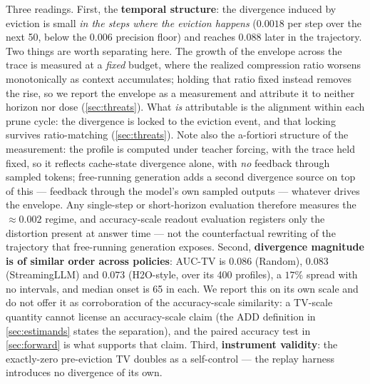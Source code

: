 \documentclass{article}
\begin{document}
Three readings. First, the \textbf{temporal structure}: the divergence induced by eviction is small \emph{in the steps where the eviction happens} ($0.0018$ per step over the next 50, below the $0.006$ precision floor) and reaches $0.088$ later in the trajectory. Two things are worth separating here. The growth of the envelope across the trace is measured at a \emph{fixed} budget, where the realized compression ratio worsens monotonically as context accumulates; holding that ratio fixed instead removes the rise, so we report the envelope as a measurement and attribute it to neither horizon nor dose (\cref{sec:threats}). What \emph{is} attributable is the alignment within each prune cycle: the divergence is locked to the eviction event, and that locking survives ratio-matching (\cref{sec:threats}). Note also the a-fortiori structure of the measurement: the profile is computed under teacher forcing, with the trace held fixed, so it reflects cache-state divergence alone, with \emph{no} feedback through sampled tokens; free-running generation adds a second divergence source on top of this --- feedback through the model's own sampled outputs --- whatever drives the envelope. Any single-step or short-horizon evaluation therefore measures the $\approx 0.002$ regime, and accuracy-scale readout evaluation registers only the distortion present at answer time --- not the counterfactual rewriting of the trajectory that free-running generation exposes. Second, \textbf{divergence magnitude is of similar order across policies}: AUC-TV is $0.086$ (Random), $0.083$ (StreamingLLM) and $0.073$ (H2O-style, over its 400 profiles), a $17\%$ spread with no intervals, and median onset is 65 in each. We report this on its own scale and do not offer it as corroboration of the accuracy-scale similarity: a TV-scale quantity cannot license an accuracy-scale claim (the ADD definition in \cref{sec:estimands} states the separation), and the paired accuracy test in \cref{sec:forward} is what supports that claim. Third, \textbf{instrument validity}: the exactly-zero pre-eviction TV doubles as a self-control --- the replay harness introduces no divergence of its own.
\end{document}
